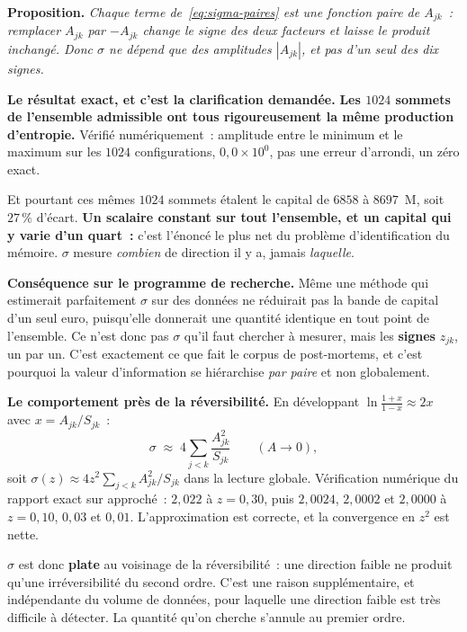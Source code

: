 \documentclass[11pt,a4paper]{article}
\begin{document}
\textbf{Proposition.} \emph{Chaque terme de~\eqref{eq:sigma-paires} est une fonction paire de
$A_{jk}$~: remplacer $A_{jk}$ par $-A_{jk}$ change le signe des deux facteurs et laisse le
produit inchangé. Donc $\sigma$ ne dépend que des amplitudes $|A_{jk}|$, et pas d'un seul des
dix signes.}

\begin{cle}[colback=orange!8,colframe=orange!70!black]
\textbf{Le résultat exact, et c'est la clarification demandée.} \textbf{Les $1024$ sommets
de l'ensemble admissible ont tous rigoureusement la même production d'entropie.} Vérifié
numériquement~: amplitude entre le minimum et le maximum sur les $1024$ configurations,
$0{,}0\times10^{0}$, pas une erreur d'arrondi, un zéro exact.

Et pourtant ces mêmes $1024$ sommets étalent le capital de $6858$ à $8697$~M, soit
$27\,\%$ d'écart. \textbf{Un scalaire constant sur tout l'ensemble, et un capital qui y
varie d'un quart~:} c'est l'énoncé le plus net du problème d'identification du mémoire.
$\sigma$ mesure \emph{combien} de direction il y a, jamais \emph{laquelle}.
\end{cle}

\medskip
\textbf{Conséquence sur le programme de recherche.} Même une méthode qui estimerait
parfaitement $\sigma$ sur des données ne réduirait pas la bande de capital d'un seul euro,
puisqu'elle donnerait une quantité identique en tout point de l'ensemble. Ce n'est donc pas
$\sigma$ qu'il faut chercher à mesurer, mais les \textbf{signes} $z_{jk}$, un par un. C'est
exactement ce que fait le corpus de post-mortems, et c'est pourquoi la valeur d'information
se hiérarchise \emph{par paire} et non globalement.

\medskip
\textbf{Le comportement près de la réversibilité.} En développant
$\ln\frac{1+x}{1-x}\approx 2x$ avec $x=A_{jk}/S_{jk}$~:
\begin{equation}
  \sigma\;\approx\;4\sum_{j<k}\frac{A_{jk}^2}{S_{jk}}
  \qquad (A\to0),
  \label{eq:sigma-quad}
\end{equation}
soit $\sigma(z)\approx 4z^2\sum_{j<k}A_{jk}^2/S_{jk}$ dans la lecture globale. Vérification
numérique du rapport exact sur approché~: $2{,}022$ à $z=0{,}30$, puis $2{,}0024$,
$2{,}0002$ et $2{,}0000$ à $z=0{,}10$, $0{,}03$ et $0{,}01$. L'approximation est correcte,
et la convergence en $z^2$ est nette.

$\sigma$ est donc \textbf{plate} au voisinage de la réversibilité~: une direction faible ne
produit qu'une irréversibilité du second ordre. C'est une raison supplémentaire, et
indépendante du volume de données, pour laquelle une direction faible est très difficile à
détecter. La quantité qu'on cherche s'annule au premier ordre.
\end{document}
